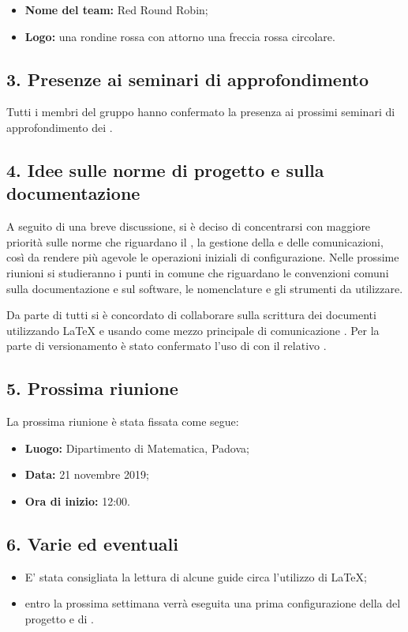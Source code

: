 \begin{itemize}
	\item \textbf{Nome del team:} Red Round Robin;
	\item \textbf{Logo:} una rondine rossa con attorno una freccia rossa circolare.
\end{itemize}

\subsection*{3. Presenze ai seminari di approfondimento}

Tutti i membri del gruppo hanno confermato la presenza ai prossimi seminari di approfondimento dei .

\subsection*{4. Idee sulle norme di progetto e sulla documentazione}


A seguito di una breve discussione, si è deciso di concentrarsi con maggiore priorità sulle norme che riguardano il , la gestione della  e delle comunicazioni, così da rendere più agevole le operazioni iniziali di configurazione.
Nelle prossime riunioni si studieranno i punti in comune che riguardano le convenzioni comuni sulla documentazione e sul software, le nomenclature e gli strumenti da utilizzare.


Da parte di tutti si è concordato di collaborare sulla scrittura dei documenti utilizzando \LaTeX{} e usando come mezzo principale di comunicazione . Per la parte di versionamento è stato confermato l'uso di  con il relativo .

\subsection*{5. Prossima riunione}

La prossima riunione è stata fissata come segue:
\begin{itemize}
	\item \textbf{Luogo:} Dipartimento di Matematica, Padova;

	\item \textbf{Data:} 21 novembre 2019;

	\item \textbf{Ora di inizio:} 12:00.
\end{itemize}


\subsection*{6. Varie ed eventuali}

\begin{itemize}

	\item E' stata consigliata la lettura di alcune guide circa l'utilizzo di \LaTeX{};
	\item entro la prossima settimana verrà eseguita una prima configurazione della  del progetto e di .
\end{itemize}


